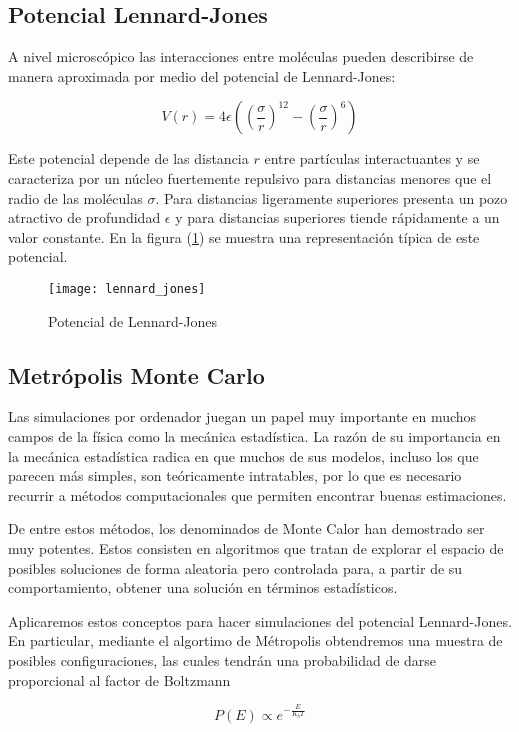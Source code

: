 \subsection{Potencial Lennard-Jones}

A nivel microscópico las interacciones entre moléculas pueden describirse de manera aproximada por medio del potencial de Lennard-Jones:

\begin{equation}
	V(r) = 4\epsilon \left( \left( \frac{\sigma}{r} \right) ^{12} - \left( \frac{\sigma}{r} \right) ^{6} \right) \label{eq_lennard}
\end{equation}

Este potencial depende de las distancia $r$ entre partículas interactuantes y se caracteriza por un núcleo fuertemente repulsivo para distancias menores que el radio de las moléculas $\sigma$. Para distancias ligeramente superiores presenta un pozo atractivo de profundidad $\epsilon$ y para distancias superiores tiende rápidamente a un valor constante. En la figura (\ref{figure_lennard}) se muestra una representación típica de este potencial.

\begin{figure}[t]
	\texttt{[image: lennard\_jones]}
	\caption{Potencial de Lennard-Jones}
	\label{figure_lennard}
\end{figure}

\subsection{Metrópolis Monte Carlo}

Las simulaciones por ordenador juegan un papel muy importante en muchos campos de la física como la mecánica estadística. La razón de su importancia en la mecánica estadística radica en que muchos de sus modelos, incluso los que parecen más simples, son teóricamente intratables, por lo que es necesario recurrir a métodos computacionales que permiten encontrar buenas estimaciones.

De entre estos métodos, los denominados de Monte Calor han demostrado ser muy potentes. Estos consisten en algoritmos que tratan de explorar el espacio de posibles soluciones de forma aleatoria pero controlada para, a partir de su comportamiento, obtener una solución en términos estadísticos. 


Aplicaremos estos conceptos para hacer simulaciones del potencial Lennard-Jones. En particular, mediante el algortimo de Métropolis obtendremos una muestra de posibles configuraciones, las cuales tendrán una probabilidad de darse proporcional al factor de Boltzmann

\begin{equation}
	P(E) \propto e^{- \frac{E}{K_b T}}
\end{equation}